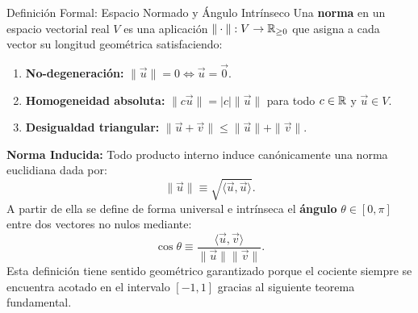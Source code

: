 \documentclass[11pt,letterpaper]{article}
\begin{document}
\begin{center}
\end{center}


\begin{infobox}{Definición Formal: Espacio Normado y Ángulo Intrínseco}
Una \textbf{norma} en un espacio vectorial real $V$ es una aplicación $\|\cdot\|: V \to \mathbb{R}_{\ge 0}$ que asigna a cada vector su longitud geométrica satisfaciendo:
\begin{enumerate}
    \item \textbf{No-degeneración:} $\|\vec{u}\| = 0 \iff \vec{u} = \vec{0}$.
    \item \textbf{Homogeneidad absoluta:} $\|c\vec{u}\| = |c|\|\vec{u}\|$ para todo $c \in \mathbb{R}$ y $\vec{u} \in V$.
    \item \textbf{Desigualdad triangular:} $\|\vec{u} + \vec{v}\| \le \|\vec{u}\| + \|\vec{v}\|$.
\end{enumerate}
\textbf{Norma Inducida:} Todo producto interno induce canónicamente una norma euclidiana dada por:
\[
\|\vec{u}\| \equiv \sqrt{\langle \vec{u}, \vec{u} \rangle}.
\]
A partir de ella se define de forma universal e intrínseca el \textbf{ángulo} $\theta \in [0, \pi]$ entre dos vectores no nulos mediante:
\[
\cos\theta \equiv \frac{\langle \vec{u}, \vec{v} \rangle}{\|\vec{u}\|\|\vec{v}\|}.
\]
Esta definición tiene sentido geométrico garantizado porque el cociente siempre se encuentra acotado en el intervalo $[-1, 1]$ gracias al siguiente teorema fundamental.
\end{infobox}
\end{document}
